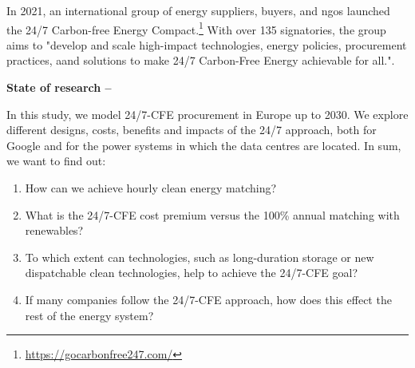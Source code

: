 In 2021, an international group of energy suppliers, buyers, and \gls{ngo}s launched the 24/7 Carbon-free Energy Compact.\footnote{\url{https://gocarbonfree247.com/}}
With over 135 signatories, the group aims to "develop and scale high-impact technologies, energy policies, procurement practices, aand solutions to make 24/7 Carbon-Free Energy achievable for all.".

\textbf{State of research --}

\cite{chalendar-2019}


In this study, we model 24/7-CFE procurement in Europe up to 2030. 
We explore different designs, costs, benefits and impacts of the 24/7 approach, both for Google and for the power systems in which the data centres are located. 
In sum, we want to find out: 

\begin{enumerate}
    \item How can we achieve hourly clean energy matching? 
    \item What is the 24/7-CFE cost premium versus the 100\% annual matching with renewables? 
    \item To which extent can technologies, such as long-duration storage or new dispatchable clean technologies, help to achieve the 24/7-CFE goal? 
    \item If many companies follow the 24/7-CFE approach, how does this effect the rest of the energy system?
\end{enumerate}



